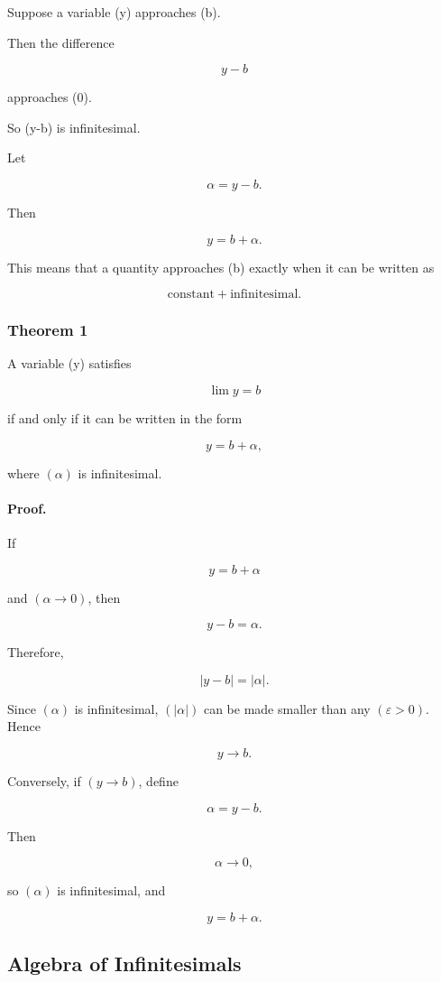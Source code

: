 Suppose a variable (y) approaches (b).

Then the difference

\[
y-b
\]

approaches (0).

So (y-b) is infinitesimal.

Let

\[
\alpha=y-b.
\]

Then

\[
y=b+\alpha.
\]

This means that a quantity approaches (b) exactly when it can be written as

\[
\text{constant}+\text{infinitesimal}.
\]

\subsubsection*{Theorem 1}

A variable (y) satisfies

\[
\lim y=b
\]

if and only if it can be written in the form

\[
y=b+\alpha,
\]

where $(\alpha)$ is infinitesimal.

\paragraph{Proof.}

If

\[
y=b+\alpha
\]

and $(\alpha\to 0)$, then

\[
y-b=\alpha.
\]

Therefore,

\[
|y-b|=|\alpha|.
\]

Since $(\alpha)$ is infinitesimal, $(|\alpha|)$ can be made smaller than any $(\varepsilon>0)$. Hence

\[
y\to b.
\]

Conversely, if $(y\to b)$, define

\[
\alpha=y-b.
\]

Then

\[
\alpha\to 0,
\]

so $(\alpha)$ is infinitesimal, and

\[
y=b+\alpha.
\]

\subsection{Algebra of Infinitesimals}

